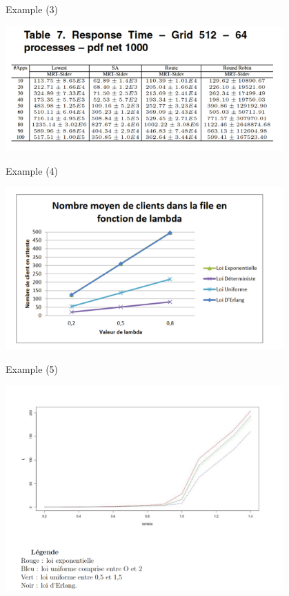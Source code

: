 \documentclass[xcolor=x11names,compress,8pt,fleqn]{beamer}
\renewcommand{\(}{\begin{columns}}
\renewcommand{\)}{\end{columns}}
\newcommand{\<}[1]{\begin{column}{#1}}
\renewcommand{\>}{\end{column}}
\begin{document}
\begin{frame}{Example (3)}
\begin{center}
\includegraphics[width=0.8\textwidth]{Example3}
\end{center}
\end{frame}
\begin{frame}{Example (4)}
\begin{center}
\includegraphics[width=0.8\textwidth]{Example4}
\end{center}
\end{frame}
\begin{frame}{Example (5)}
\begin{center}
\includegraphics[width=0.8\textwidth]{Example5}
\end{center}
\end{frame}
\end{document}
